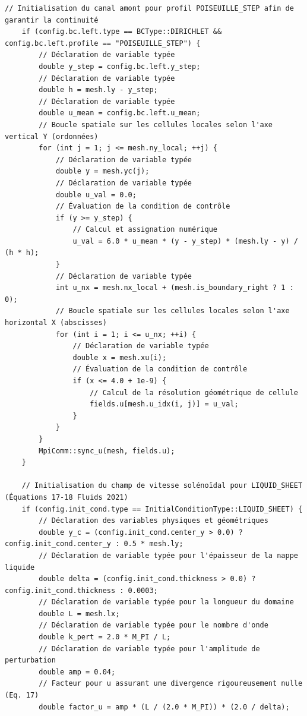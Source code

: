 \documentclass[10pt,a4paper,oneside]{book}
\begin{document}
\begin{lstlisting}[language={[11]C++}]
    // Initialisation du canal amont pour profil POISEUILLE_STEP afin de garantir la continuité
    if (config.bc.left.type == BCType::DIRICHLET && config.bc.left.profile == "POISEUILLE_STEP") {
        // Déclaration de variable typée
        double y_step = config.bc.left.y_step;
        // Déclaration de variable typée
        double h = mesh.ly - y_step;
        // Déclaration de variable typée
        double u_mean = config.bc.left.u_mean;
        // Boucle spatiale sur les cellules locales selon l'axe vertical Y (ordonnées)
        for (int j = 1; j <= mesh.ny_local; ++j) {
            // Déclaration de variable typée
            double y = mesh.yc(j);
            // Déclaration de variable typée
            double u_val = 0.0;
            // Évaluation de la condition de contrôle
            if (y >= y_step) {
                // Calcul et assignation numérique
                u_val = 6.0 * u_mean * (y - y_step) * (mesh.ly - y) / (h * h);
            }
            // Déclaration de variable typée
            int u_nx = mesh.nx_local + (mesh.is_boundary_right ? 1 : 0);
            // Boucle spatiale sur les cellules locales selon l'axe horizontal X (abscisses)
            for (int i = 1; i <= u_nx; ++i) {
                // Déclaration de variable typée
                double x = mesh.xu(i);
                // Évaluation de la condition de contrôle
                if (x <= 4.0 + 1e-9) {
                    // Calcul de la résolution géométrique de cellule
                    fields.u[mesh.u_idx(i, j)] = u_val;
                }
            }
        }
        MpiComm::sync_u(mesh, fields.u);
    }

    // Initialisation du champ de vitesse solénoïdal pour LIQUID_SHEET (Équations 17-18 Fluids 2021)
    if (config.init_cond.type == InitialConditionType::LIQUID_SHEET) {
        // Déclaration des variables physiques et géométriques
        double y_c = (config.init_cond.center_y > 0.0) ? config.init_cond.center_y : 0.5 * mesh.ly;
        // Déclaration de variable typée pour l'épaisseur de la nappe liquide
        double delta = (config.init_cond.thickness > 0.0) ? config.init_cond.thickness : 0.0003;
        // Déclaration de variable typée pour la longueur du domaine
        double L = mesh.lx;
        // Déclaration de variable typée pour le nombre d'onde
        double k_pert = 2.0 * M_PI / L;
        // Déclaration de variable typée pour l'amplitude de perturbation
        double amp = 0.04;
        // Facteur pour u assurant une divergence rigoureusement nulle (Eq. 17)
        double factor_u = amp * (L / (2.0 * M_PI)) * (2.0 / delta);


\end{lstlisting}
\end{document}
